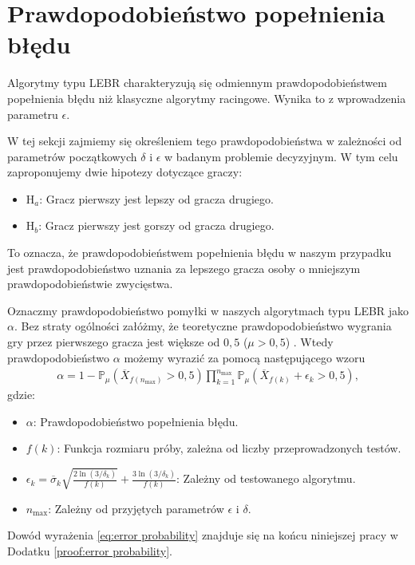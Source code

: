 \documentclass[inzynierska]{pwr_wmat_praca_dyplomowa}
\theoremstyle{plain}
\numberwithin{theorem}{chapter}
\theoremstyle{definition}
\numberwithin{theorem}{chapter}
\newcommand{\probP}{\mathbb{P}}
\newcommand{\nmax}{n_{\text{max}}}
\begin{document}
	\section{Prawdopodobieństwo popełnienia błędu}
		Algorytmy typu LEBR charakteryzują się odmiennym prawdopodobieństwem popełnienia błędu niż klasyczne algorytmy racingowe. Wynika to z wprowadzenia parametru $\epsilon$.
		
		W tej sekcji zajmiemy się określeniem tego prawdopodobieństwa w zależności od parametrów początkowych $\delta$ i $\epsilon$ w badanym problemie decyzyjnym. W tym celu zaproponujemy dwie hipotezy dotyczące graczy:
	\begin{itemize}
		\item $\text{H}_a$: Gracz pierwszy jest lepszy od gracza drugiego.
		\item  $\text{H}_b$: Gracz pierwszy jest gorszy od gracza drugiego.
	\end{itemize}
	To oznacza, że prawdopodobieństwem popełnienia błędu w naszym przypadku jest prawdopodobieństwo uznania za lepszego gracza osoby o mniejszym prawdopodobieństwie zwycięstwa.
	
	Oznaczmy prawdopodobieństwo pomyłki w naszych algorytmach typu LEBR jako $\alpha$. Bez straty ogólności załóżmy, że teoretyczne prawdopodobieństwo wygrania gry przez pierwszego gracza jest większe od $0,5$ ($\mu > 0,5$)%
	. Wtedy prawdopodobieństwo $\alpha$ możemy wyrazić za pomocą następującego wzoru
	\begin{gather}
		\label{eq:error probability}
		\alpha = 1 - \probP_{\mu}(\overline{X}_{f(\nmax)} > 0,5)
 \prod^{\nmax}_{k=1} \probP_{\mu}(\overline{X}_{f(k)} +  \epsilon_{k} > 0,5),
	\end{gather}
	gdzie:
	\begin{itemize}
		\item $\alpha$: Prawdopodobieństwo popełnienia błędu.
		\item $f(k)$: Funkcja rozmiaru próby, zależna od liczby przeprowadzonych testów.
		\item $\epsilon_k = \overline{\sigma}_k \sqrt{\frac{2\ln(3/\delta_k)}{f(k)}}+\frac{3\ln(3/\delta_k)}{f(k)}$: Zależny od testowanego algorytmu.
		\item $\nmax$: Zależny od przyjętych parametrów $\epsilon$ i $\delta$.
	\end{itemize}
	Dowód wyrażenia \eqref{eq:error probability} znajduje się na końcu niniejszej pracy w Dodatku \ref{proof:error probability}.
	
\end{document}
